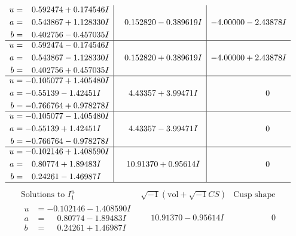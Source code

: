 \documentclass[1p]{elsarticle_modified}
\theoremstyle{definition}
\newcommand{\I}{\sqrt{-1}}
\begin{document}
$$\begin{array}{c|c|c}
\begin{aligned}
u &= \phantom{-}0.592474 + 0.174546 I \\
a &= \phantom{-}0.543867 + 1.128330 I \\
b &= \phantom{-}0.402756 - 0.457035 I\end{aligned}
 & \phantom{-}0.152820 - 0.389619 I & -4.00000 - 2.43878 I \\ \hline\begin{aligned}
u &= \phantom{-}0.592474 - 0.174546 I \\
a &= \phantom{-}0.543867 - 1.128330 I \\
b &= \phantom{-}0.402756 + 0.457035 I\end{aligned}
 & \phantom{-}0.152820 + 0.389619 I & -4.00000 + 2.43878 I \\ \hline\begin{aligned}
u &= -0.105077 + 1.405480 I \\
a &= -0.55139 - 1.42451 I \\
b &= -0.766764 + 0.978278 I\end{aligned}
 & \phantom{-}4.43357 + 3.99471 I & \phantom{-0.000000 } 0 \\ \hline\begin{aligned}
u &= -0.105077 - 1.405480 I \\
a &= -0.55139 + 1.42451 I \\
b &= -0.766764 - 0.978278 I\end{aligned}
 & \phantom{-}4.43357 - 3.99471 I & \phantom{-0.000000 } 0 \\ \hline\begin{aligned}
u &= -0.102146 + 1.408590 I \\
a &= \phantom{-}0.80774 + 1.89483 I \\
b &= \phantom{-}0.24261 - 1.46987 I\end{aligned}
 & \phantom{-}10.91370 + 0.95614 I & \phantom{-0.000000 } 0\\
 \hline 
 \end{array}$$\newpage$$\begin{array}{c|c|c}  
\text{Solutions to }I^u_{1}& \I (\text{vol} + \sqrt{-1}CS) & \text{Cusp shape}\\
 \hline 
\begin{aligned}
u &= -0.102146 - 1.408590 I \\
a &= \phantom{-}0.80774 - 1.89483 I \\
b &= \phantom{-}0.24261 + 1.46987 I\end{aligned}
 & \phantom{-}10.91370 - 0.95614 I & \phantom{-0.000000 } 0 \\ \hline\begin{aligned}

\end{aligned}
\end{array}$$
\end{document}

